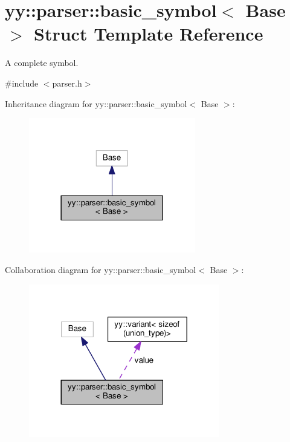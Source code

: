 \hypertarget{structyy_1_1parser_1_1basic__symbol}{}\section{yy\+:\+:parser\+:\+:basic\+\_\+symbol$<$ Base $>$ Struct Template Reference}
\label{structyy_1_1parser_1_1basic__symbol}


A complete symbol.  




{\ttfamily \#include $<$parser.\+h$>$}



Inheritance diagram for yy\+:\+:parser\+:\+:basic\+\_\+symbol$<$ Base $>$\+:\nopagebreak
\begin{figure}[H]
\begin{center}
\leavevmode
\includegraphics[width=206pt]{structyy_1_1parser_1_1basic__symbol__inherit__graph}
\end{center}
\end{figure}


Collaboration diagram for yy\+:\+:parser\+:\+:basic\+\_\+symbol$<$ Base $>$\+:\nopagebreak
\begin{figure}[H]
\begin{center}
\leavevmode
\includegraphics[width=236pt]{structyy_1_1parser_1_1basic__symbol__coll__graph}
\end{center}
\end{figure}
